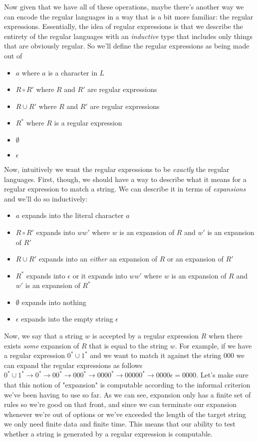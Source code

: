 \documentclass[11pt]{article}
\begin{document}
Now given that we have all of these operations, maybe there's another way we can encode the regular languages in a way that is a bit more familiar: the regular expressions. Essentially, the idea of regular expressions is that we describe the entirety of the regular languages with an \emph{inductive} type that includes only things that are obviously regular. So we'll define the regular expressions as being made out of 

\begin{itemize}
\item $a$ where $a$ is a character in $L$
\item $R \circ R'$ where $R$ and $R'$ are regular expressions
\item $R \cup R'$ where $R$ and $R'$ are regular expressions
\item $R^*$ where $R$ is a regular expression
\item $\emptyset$
\item $\epsilon$
\end{itemize}

Now, intuitively we want the regular expressions to be \emph{exactly} the regular languages. First, though, we should have a way to describe what it means for a regular expression to match a string. We can describe it in terms of \emph{expansions} and we'll do so inductively:

\begin{itemize}
\item $a$ expands into the literal character $a$
\item $R \circ R'$ expands into $w w'$ where $w$ is an expansion of $R$ and $w'$ is an expansion of $R'$
\item $R \cup R'$ expands into an \emph{either} an expansion of $R$ or an expansion of $R'$
\item $R^*$ expands into $\epsilon$ or it expands into $w w'$ where $w$ is an expansion of $R$ and $w'$ is an expansion of $R^*$
\item $\emptyset$ expands into nothing
\item $\epsilon$ expands into the empty string $\epsilon$
\end{itemize}

Now, we say that a string $w$ is accepted by a regular expression $R$ when there exists \emph{some} expansion of $R$ that is equal to the string $w$. For example, if we have a regular expression $0^* \cup 1^*$ and we want to match it against the string $000$ we can expand the regular expressions as follows $0^* \cup 1^* \to 0^* \to 00^* \to 000^* \to 0000^* \to 00000^* \to 0000 \epsilon = 0000$. Let's make sure that this notion of "expansion" is computable according to the informal criterion we've been having to use so far. As we can see, expansion only has a finite set of rules so we're good on that front, and since we can terminate our expansion whenever we're out of options or we've exceeded the length of the target string we only need finite data and finite time. This means that our ability to test whether a string is generated by a regular expression is computable.
\end{document}
